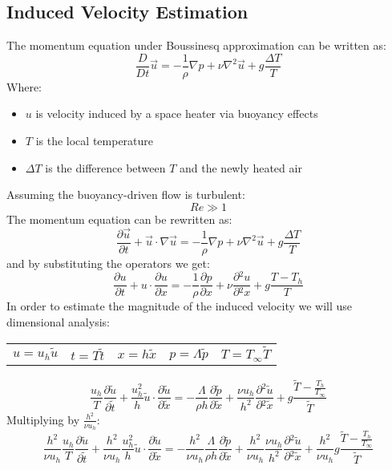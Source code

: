\documentclass[11pt, a4paper]{article}
\newcommand{\parder}[2]{\frac{\partial {#1}}{\partial {#2}}}
\begin{document}
\subsection{Induced Velocity Estimation}
The momentum equation under Boussinesq approximation can be written as:
\begin{equation}
    \frac{D}{Dt}\vec{u}=-\frac{1}{\rho}\nabla p+\nu\nabla^2\vec{u}+g\frac{\Delta T}{T}
\end{equation}
Where:
\begin{itemize}
    \item $u$ is velocity induced by a space heater via buoyancy effects
    \item $T$ is the local temperature
    \item $\Delta T$ is the difference between $T$ and the newly heated air
\end{itemize}
Assuming the buoyancy-driven flow is turbulent:
\begin{equation*}
    Re\gg1
\end{equation*}
The momentum equation can be rewritten as:
\begin{equation*}
    \parder{\vec{u}}{t}+\vec{u}\cdot\nabla\vec{u}=-\frac{1}{\rho}\nabla p+\nu\nabla^2\vec{u}+g\frac{\Delta T}{T}
\end{equation*}
and by substituting the operators we get:
\begin{equation}
    \parder{u}{t}+u\cdot\parder{u}{x}=-\frac{1}{\rho}\parder{p}{x}+\nu\parder{^2u}{^2x}+g\frac{T-T_h}{T}
\end{equation}
In order to estimate the magnitude of the induced velocity we will use dimensional analysis:
\begin{table}[H]
    \center
    \begin{tabular}{c|c|c|c|c}
        $u=u_h\tilde{u}$ & $t=T\tilde{t}$ & $x=h\tilde{x}$ & $p=\Lambda\tilde{p}$ & $T=T_\infty\tilde{T}$
    \end{tabular}
\end{table}
\begin{equation}
    \frac{u_h}{T}\parder{\tilde{u}}{\tilde{t}}+\frac{u_h^2}{h}\tilde{u}\cdot\parder{\tilde{u}}{\tilde{x}}=-\frac{\Lambda}{\rho h}\parder{\tilde{p}}{\tilde{x}}+\frac{\nu u_h}{h^2}\parder{^2\tilde{u}}{^2\tilde{x}}+g\frac{\tilde{T}-\displaystyle\frac{T_h}{T_\infty}}{\tilde{T}}
\end{equation}
Multiplying by $\displaystyle\frac{h^2}{\nu u_h}$:
\begin{equation}
    \frac{h^2}{\nu u_h}\frac{u_h}{T}\parder{\tilde{u}}{\tilde{t}}+\frac{h^2}{\nu u_h}\frac{u_h^2}{h}\tilde{u}\cdot\parder{\tilde{u}}{\tilde{x}}=-\frac{h^2}{\nu u_h}\frac{\Lambda}{\rho h}\parder{\tilde{p}}{\tilde{x}}+\frac{h^2}{\nu u_h}\frac{\nu u_h}{h^2}\parder{^2\tilde{u}}{^2\tilde{x}}+\frac{h^2}{\nu u_h}g\frac{\tilde{T}-\displaystyle\frac{T_h}{T_\infty}}{\tilde{T}}
\end{equation}
\end{document}
